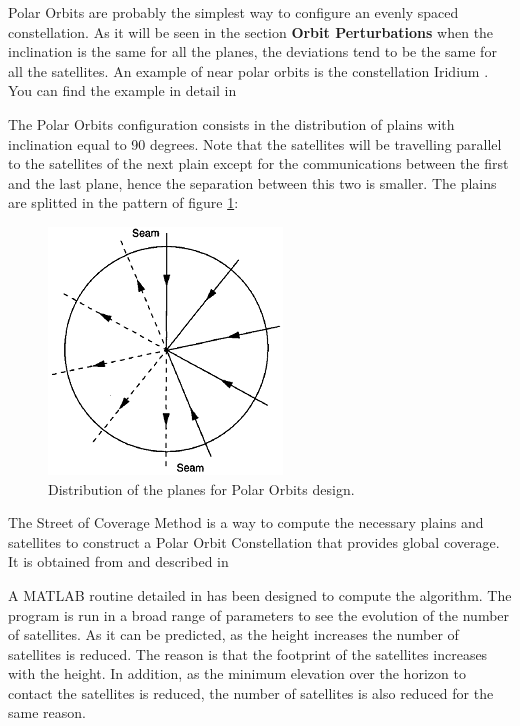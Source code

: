 Polar Orbits are probably the simplest way to configure an evenly spaced constellation. As it will be seen in the section \textbf{Orbit Perturbations} when the inclination is the same for all the planes, the deviations tend to be the same for all the satellites. An example of near polar orbits is the constellation Iridium \cite{Iridium}. You can find the example in detail in \cite[Chapter 3, Section 2]{annex1}

\begin{minipage}{0.45\textwidth}
The Polar Orbits configuration consists in the distribution of plains with inclination equal to 90 degrees. Note that the satellites will be travelling parallel to the satellites of the next plain except for the communications between the first and the last plane, hence the separation between this two is smaller. The plains are splitted in the pattern of figure \ref{fig:polardist}:
\end{minipage}
\vline
\begin{minipage}{0.45\textwidth}
\begin{figure}[H]
\begin{center}
\includegraphics[scale=0.40]{PolarOrbits/planeconfig.png}
\caption{Distribution of the planes for Polar Orbits design.}
\label{fig:polardist}
\end{center}
\end{figure}

\end{minipage}

The Street of Coverage Method is a way to compute the necessary plains and satellites to construct a Polar Orbit Constellation that provides global coverage. It is obtained from 
\cite{Chobotov2002} and described in 
\cite[Chapter 3, Section 3]{annex1}

A MATLAB routine detailed in \cite[Chapter 1, Section 3]{annex6} has been designed to compute the  algorithm. The program is run in a broad range of parameters to see the evolution of the number of satellites. As it can be predicted, as the height increases the number of satellites is reduced. The reason is that the footprint of the satellites increases with the height. In addition, as the minimum elevation over the horizon to contact the satellites is reduced, the number of satellites is also reduced for the same reason. 

